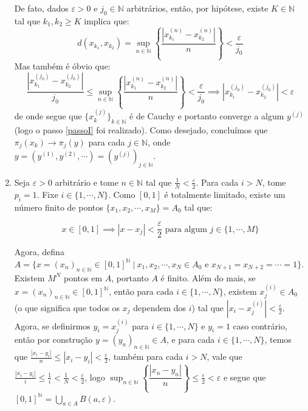 \begin{dem}
\begin{enumerate}[label=\color{blue}\normalfont\textbf{(\alph*)}]
        De fato, dados $\varepsilon > 0$ e $j_0 \in \mathbb{N}$ arbitrários, então, por hipótese, existe $K \in \mathbb{N}$ tal que $k_1, k_2 \geq K$ implica que:
            $$d(x_{k_1}, x_{k_2}) = \displaystyle{\sup_{n \in \mathbb{N}}} \left\{\dfrac{\left|x_{k_1}^{(n)} - x_{k_2}^{(n)} \right|}{n}  \right\} < \dfrac{\varepsilon}{j_0}$$
        Mas também é óbvio que:
        $$\dfrac{\left|x_{k_1}^{(j_0)} - x_{k_2}^{(j_0)}\right|}{j_0} \leq  \displaystyle{\sup_{n \in \mathbb{N}}} \left\{\dfrac{\left|x_{k_1}^{(n)} - x_{k_2}^{(n)} \right|}{n}  \right\} < \dfrac{\varepsilon}{j_0} \implies \left|x_{k_1}^{(j_0)} - x_{k_2}^{(j_0)}\right| < \varepsilon$$
        de onde segue que $\{x_k^{(j)} \}_{k \in \mathbb{N}} $ é de Cauchy e portanto converge a algum $y^{(j)}$ (logo o passo \ref{passoI} foi realizado). Como desejado, concluímos que $\pi_j(x_k) \to \pi_j(y)$ para cada $j \in \mathbb{N}$, onde $y = (y^{(1)}, y^{(2)}, \cdots) = (y^{(j)})_{j \in \mathbb{N}}$.
        \item Seja $\varepsilon > 0$ arbitrário e tome $n \in \mathbb{N}$ tal que $\frac{1}{N} < \frac{\varepsilon}{2}$. Para cada $i > N$, tome $p_i = 1$. Fixe $i \in \{1, \cdots, N \}$. Como $[0,1]$ é totalmente limitado, existe um número finito de pontos $\{x_1, x_2, \cdots, x_M\} = A_0$ tal que:

        $$x \in [0, 1] \implies |x - x_j| < \frac{\varepsilon}{2} \text{ para algum $j \in \{1, \cdots, M\}$}$$ 
        
        Agora, defina $A = \{x = (x_n)_{n \in \mathbb{N}} \in [0,1]^{\mathbb{N}} \ \vert \ x_1, x_2, \cdots, x_N \in A_0 \text{ e } x_{N+1} = x_{N+2} = \cdots = 1  \}$. Existem $M^N$ pontos em $A$, portanto $A$ é finito. Além do mais, se $x = (x_n)_{n \in \mathbb{N}} \in [0,1]^{\mathbb{N}}$, então para cada $i \in \{1, \cdots, N\}$, existem $x^{(i)}_j \in A_0$ (o que significa que todos os $x_j$ dependem dos $i$) tal que $|x_i - x^{(i)}_j | < \frac{\varepsilon}{2}$. Agora, se definirmos $y_i = x^{(i)}_j $ para $i \in \{1, \cdots, N\}$ e $y_i = 1$ caso contrário, então por construção $y = (y_n)_{n \in \mathbb{N}} \in A$, e para cada $i \in \{1, \cdots, N\}$, temos que $\frac{|x_i - y_i|}{n} \leq |x_i - y_i| < \frac{\varepsilon}{2}$, também para cada $i > N$, vale que $\frac{|x_i - y_i|}{i} \leq \frac{1}{i} < \frac{1}{N} < \frac{\varepsilon}{2}$, logo $\displaystyle{\sup_{n \in \mathbb{N}}} \left\{\dfrac{\left|x_n - y_n \right|}{n} \right\} \leq \frac{\varepsilon}{2} < \varepsilon$ e segue que $[0,1]^{\mathbb{N}} = \displaystyle{\bigcup_{a \in A}B(a,\varepsilon)}$.
\end{enumerate}
\end{dem}

